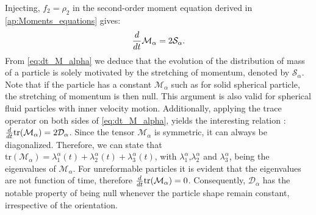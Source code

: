 Injecting, $f_2 = \rho_2$ in the second-order moment equation derived in \ref{ap:Moments_equations} gives:
\begin{equation}
    \frac{d}{d t} \mathcal{M}_\alpha=2\mathcal{S}_\alpha. 
    \label{eq:dt_M_alpha}
\end{equation}
From \ref{eq:dt_M_alpha} we deduce that the evolution of the distribution of mass of a particle is solely motivated by the stretching of momentum, denoted by $\mathcal{S}_\alpha$. 
Note that if the particle has a constant $\mathcal{M}_\alpha$ such as for solid spherical particle, the stretching of momentum is then null.
This argument is also valid for spherical fluid particles with inner velocity motion.  
Additionally, applying the trace operator on both sides of \ref{eq:dt_M_alpha}, yields the interesting relation : $\frac{d}{d t} \text{tr}(\mathcal{M}_\alpha)=2\mathcal{D}_\alpha$.
Since the tensor $\mathcal{M}_\alpha$ is symmetric, it can always be diagonalized. 
Therefore, we can state that $\text{tr}(\mathcal{M}_\alpha) = \lambda^\alpha_1(t)+\lambda^\alpha_2(t)+\lambda^\alpha_3(t)$, with $\lambda_1^\alpha$,$\lambda_2^\alpha$ and $\lambda_3^\alpha$, being the eigenvalues of $\mathcal{M}_\alpha$.
For unreformable particles it is evident that the eigenvalues are not function of time, therefore $\frac{d}{d t} \text{tr}(\mathcal{M}_\alpha)=0$.  
Consequently, $\mathcal{D}_\alpha$ has the notable property of being null whenever the particle shape remain constant, irrespective of the orientation.




